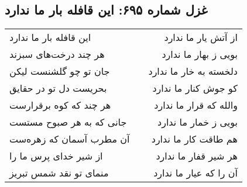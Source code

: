 \begin{center}
\section*{غزل شماره ۶۹۵: این قافله بار ما ندارد}
\label{sec:0695}
\begin{longtable}{l p{0.5cm} r}
این قافله بار ما ندارد
&&
از آتش یار ما ندارد
\\
هر چند درخت‌های سبزند
&&
بویی ز بهار ما ندارد
\\
جان تو چو گلشنست لیکن
&&
دلخسته به خار ما ندارد
\\
بحریست دل تو در حقایق
&&
کو جوش کنار ما ندارد
\\
هر چند که کوه برقرارست
&&
والله که قرار ما ندارد
\\
جانی که به هر صبوح مستست
&&
بویی ز خمار ما ندارد
\\
آن مطرب آسمان که زهره‌ست
&&
هم طاقت کار ما ندارد
\\
از شیر خدای پرس ما را
&&
هر شیر قفار ما ندارد
\\
منمای تو نقد شمس تبریز
&&
آن را که عیار ما ندارد
\\
\end{longtable}
\end{center}

